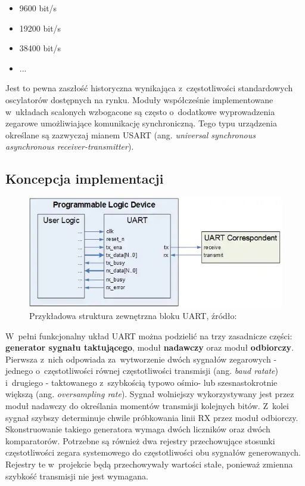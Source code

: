 \begin{itemize}
    \item 9600 bit/s
    \item 19200 bit/s
    \item 38400 bit/s
    \item ...
\end{itemize}

Jest to pewna zaszłość historyczna wynikająca z~częstotliwości standardowych oscylatorów dostępnych na rynku. Moduły współcześnie implementowane w~układach scalonych wzbogacone są często o~dodatkowe wyprowadzenia zegarowe umożliwiające komunikację synchroniczną. Tego typu urządzenia określane są zazwyczaj mianem USART (ang. \textit{universal synchronous asynchronous receiver-transmitter}).


\subsection{Koncepcja implementacji}

\begin{figure}[ht]
    \centering
    \includegraphics[scale=0.6]{img/theoretical-analysis/uart_core.png}
    \captionsetup{format=plain,justification=centering}
    \caption{Przykładowa struktura zewnętrzna bloku UART, źródło: \cite{uart_core}}
    \label{uart-core}
\end{figure}

W~pełni funkcjonalny układ UART można podzielić na trzy zasadnicze części: \textbf{generator sygnału taktującego}, moduł \textbf{nadawczy} oraz moduł \textbf{odbiorczy}. Pierwsza z~nich odpowiada za~wytworzenie dwóch sygnałów zegarowych - jednego o~częstotliwości równej częstotliwości transmisji (ang. \textit{baud ratate}) i~drugiego - taktowanego z~szybkością typowo ośmio- lub szesnastokrotnie większą (ang. \textit{oversampling rate}). Sygnał wolniejszy wykorzystywany jest przez moduł nadawczy do określania momentów transmisji kolejnych bitów. Z~kolei sygnał szybszy determinuje chwile próbkowania linii RX przez moduł odbiorczy. Skonstruowanie takiego generatora wymaga dwóch liczników oraz dwóch komparatorów. Potrzebne są również dwa rejestry przechowujące stosunki częstotliwości zegara systemowego do częstotliwości obu sygnałów generowanych. Rejestry te w~projekcie będą przechowywały wartości stałe, ponieważ zmienna szybkość transmisji nie jest wymagana.

